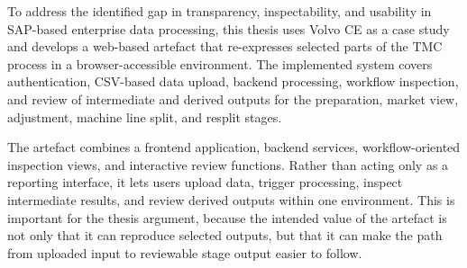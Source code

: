 To address the identified gap in transparency, inspectability, and usability in SAP-based enterprise data processing, this thesis uses Volvo CE as a case study and develops a web-based artefact that re-expresses selected parts of the TMC process in a browser-accessible environment. The implemented system covers authentication, CSV-based data upload, backend processing, workflow inspection, and review of intermediate and derived outputs for the preparation, market view, adjustment, machine line split, and resplit stages.

The artefact combines a frontend application, backend services, workflow-oriented inspection views, and interactive review functions. Rather than acting only as a reporting interface, it lets users upload data, trigger processing, inspect intermediate results, and review derived outputs within one environment. This is important for the thesis argument, because the intended value of the artefact is not only that it can reproduce selected outputs, but that it can make the path from uploaded input to reviewable stage output easier to follow.


























